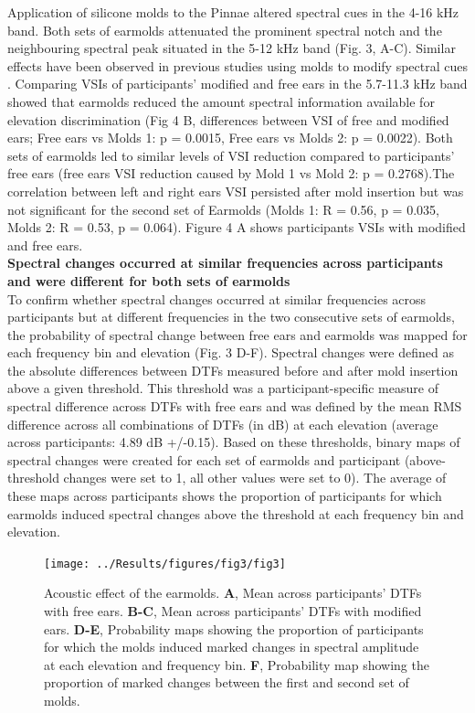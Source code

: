 Application of silicone molds to the Pinnae altered spectral cues in the 4-16 kHz band. Both sets of earmolds attenuated the prominent spectral notch and the neighbouring spectral peak situated in the 5-12 kHz band (Fig. 3, A-C). Similar effects have been observed in previous studies using molds to modify spectral cues \citep{trapeau_fast_2016}\citep{wanrooij_relearning_2005}\citep{hofman_relearning_1998}. Comparing VSIs of participants' modified and free ears in the 5.7-11.3 kHz band showed that earmolds reduced the amount spectral information available for elevation discrimination (Fig 4 B, differences between VSI of free and modified ears; Free ears vs Molds 1: p = 0.0015, Free ears vs Molds 2: p = 0.0022). Both sets of earmolds led to similar levels of VSI reduction compared to participants' free ears (free ears VSI reduction caused by Mold 1 vs Mold 2: p = 0.2768).The correlation between left and right ears VSI persisted after mold insertion but was not significant for the second set of Earmolds (Molds 1: R = 0.56, p = 0.035, Molds 2: R = 0.53, p = 0.064). Figure 4 A shows participants VSIs with modified and free ears.\\

\noindent\textbf{Spectral changes occurred at similar frequencies across participants and were different for both sets of earmolds}\\

To confirm whether spectral changes occurred at similar frequencies across participants but at different frequencies in the two consecutive sets of earmolds, the probability of spectral change between free ears and earmolds was mapped for each frequency bin and elevation (Fig. 3 D-F). Spectral changes were defined as the absolute differences between DTFs measured before and after mold insertion above a given threshold. This threshold was a participant-specific measure of spectral difference across DTFs with free ears and was defined by the mean RMS difference across all combinations of DTFs (in dB) at each elevation (average across participants: 4.89 dB +/-0.15). Based on these thresholds, binary maps of spectral changes were created for each set of earmolds and participant (above-threshold changes were set to 1, all other values were set to 0). The average of these maps across participants shows the proportion of participants for which earmolds induced spectral changes above the threshold at each frequency bin and elevation.\\

\begin{figure}[h]
	\texttt{[image: ../Results/figures/fig3/fig3]}
	\caption{Acoustic effect of the earmolds. \textbf{A}, Mean across participants' DTFs with free ears.
	\textbf{B-C}, Mean across participants' DTFs with modified ears. \textbf{D-E}, Probability maps showing the 		proportion of participants for which the molds induced marked changes in spectral amplitude at each elevation 		and frequency bin. \textbf{F}, Probability map showing the proportion of marked changes between the first and 		second set of molds.}
        \label{fig:third}
\end{figure}

